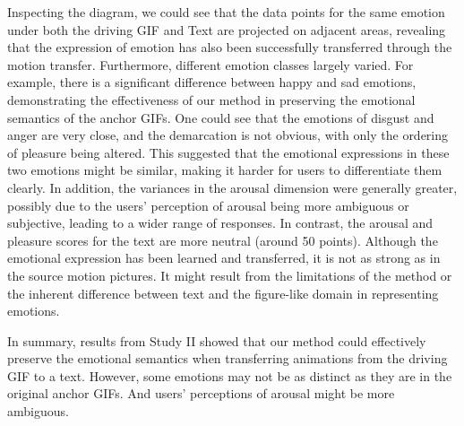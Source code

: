 Inspecting the diagram, we could see that the data points for the same emotion under both the driving GIF and Text are projected on adjacent areas, revealing that the expression of emotion has also been successfully transferred through the motion transfer. 
Furthermore, different emotion classes largely varied.
For example, there is a significant difference between happy and sad emotions, demonstrating the effectiveness of our method in preserving the emotional semantics of the anchor GIFs.
One could see that the emotions of disgust and anger are very close, and the demarcation is not obvious, with only the ordering of pleasure being altered. 
This suggested that the emotional expressions in these two emotions might be similar, making it harder for users to differentiate them clearly.
In addition, the variances in the arousal dimension were generally greater, possibly due to the users' perception of arousal being more ambiguous or subjective, leading to a wider range of responses.
In contrast, the arousal and pleasure scores for the text are more neutral (around 50 points). 
Although the emotional expression has been learned and transferred, it is not as strong as in the source motion pictures. 
It might result from the limitations of the method or the inherent difference between text and the figure-like domain in representing emotions.



In summary, results from Study II showed that our method could effectively preserve the emotional semantics when transferring animations from the driving GIF to a text. However, some emotions may not be as distinct as they are in the original anchor GIFs. And users' perceptions of arousal might be more ambiguous. 


